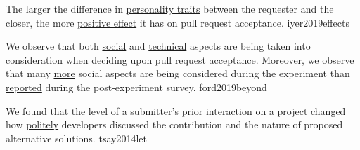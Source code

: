 \documentclass{article}
\begin{document}
  {The larger the difference in \ul{personality traits} between the requester and the closer, the more \ul{positive effect} it has on pull request acceptance.}
  {iyer2019effects}

  {We observe that both \ul{social} and \ul{technical} aspects are being taken into consideration when deciding upon pull request acceptance. Moreover, we observe that many \ul{more} social aspects are being considered during the experiment than \ul{reported} during the post-experiment survey.}
  {ford2019beyond}



  {We found that the level of a submitter's prior interaction on a project changed how \ul{politely} developers discussed the contribution and the nature of proposed alternative solutions.}
  {tsay2014let}

\end{document}
